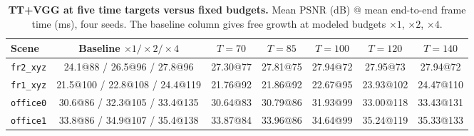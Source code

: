 \begin{table}[tbp]
\centering
\footnotesize\setlength{\tabcolsep}{2pt}
\begin{tabular}{lcccccc}
\toprule
\textbf{Scene} & \textbf{Baseline $\times1/\times2/\times4$} & $T=70$ & $T=85$ & $T=100$ & $T=120$ & $T=140$ \\
\midrule
\texttt{fr2\_xyz} & 24.1@88 / 26.5@96 / 27.8@96 & 27.30@77 & 27.81@75 & 27.94@72 & 27.95@73 & 27.94@72 \\
\texttt{fr1\_xyz} & 21.5@100 / 22.8@108 / 24.4@119 & 21.76@92 & 21.86@92 & 22.67@95 & 23.93@102 & 24.47@110 \\
\texttt{office0} & 30.6@86 / 32.3@105 / 33.4@135 & 30.64@83 & 30.79@86 & 31.93@99 & 33.00@118 & 33.43@131 \\
\texttt{office1} & 33.8@86 / 34.9@107 / 35.4@138 & 33.87@84 & 33.96@86 & 34.64@99 & 35.24@119 & 35.33@133 \\
\bottomrule
\end{tabular}
\caption{\textbf{TT+VGG at five time targets versus fixed budgets.} Mean PSNR (dB) @ mean end-to-end frame time (ms), four seeds. The baseline column gives free growth at modeled budgets $\times1$, $\times2$, $\times4$.}
\label{tab:pareto}
\end{table}
